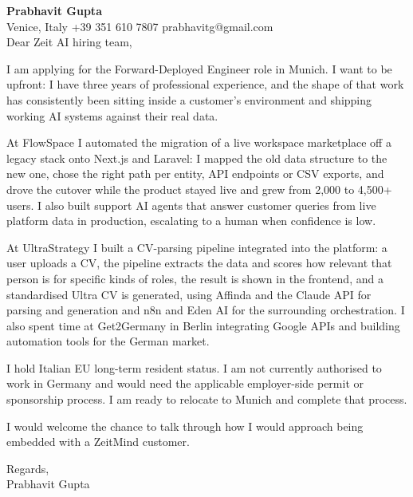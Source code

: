 \documentclass[a4paper,10.5pt]{article}
\begin{document}
\textbf{Prabhavit Gupta}\\
Venice, Italy \textbar{} +39 351 610 7807 \textbar{} prabhavitg@gmail.com\\[10pt]
Dear Zeit AI hiring team,

I am applying for the Forward-Deployed Engineer role in Munich. I want to be upfront: I have three years of professional experience, and the shape of that work has consistently been sitting inside a customer's environment and shipping working AI systems against their real data.

At FlowSpace I automated the migration of a live workspace marketplace off a legacy stack onto Next.js and Laravel: I mapped the old data structure to the new one, chose the right path per entity, API endpoints or CSV exports, and drove the cutover while the product stayed live and grew from 2,000 to 4,500+ users. I also built support AI agents that answer customer queries from live platform data in production, escalating to a human when confidence is low.

At UltraStrategy I built a CV-parsing pipeline integrated into the platform: a user uploads a CV, the pipeline extracts the data and scores how relevant that person is for specific kinds of roles, the result is shown in the frontend, and a standardised Ultra CV is generated, using Affinda and the Claude API for parsing and generation and n8n and Eden AI for the surrounding orchestration. I also spent time at Get2Germany in Berlin integrating Google APIs and building automation tools for the German market.

I hold Italian EU long-term resident status. I am not currently authorised to work in Germany and would need the applicable employer-side permit or sponsorship process. I am ready to relocate to Munich and complete that process.

I would welcome the chance to talk through how I would approach being embedded with a ZeitMind customer.

Regards,\\
Prabhavit Gupta
\end{document}
